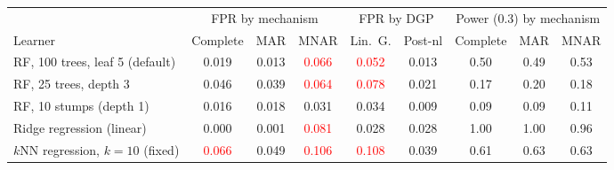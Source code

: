 \begin{tabular}{lcccccccc}
    \toprule
     & \multicolumn{3}{c}{FPR by mechanism} & \multicolumn{2}{c}{FPR by DGP} & \multicolumn{3}{c}{Power (0.3) by mechanism} \\
    \cmidrule(lr){2-4} \cmidrule(lr){5-6} \cmidrule(lr){7-9}
    Learner & Complete & MAR & MNAR & Lin.\ G. & Post-nl & Complete & MAR & MNAR \\
    \midrule
    RF, 100 trees, leaf 5 (default)      & 0.019 & 0.013 & \textcolor{red}{0.066} & \textcolor{red}{0.052} & 0.013 & 0.50 & 0.49 & 0.53 \\
    RF, 25 trees, depth 3                & 0.046 & 0.039 & \textcolor{red}{0.064} & \textcolor{red}{0.078} & 0.021 & 0.17 & 0.20 & 0.18 \\
    RF, 10 stumps (depth 1)              & 0.016 & 0.018 & 0.031 & 0.034 & 0.009 & 0.09 & 0.09 & 0.11 \\
    Ridge regression (linear)            & 0.000 & 0.001 & \textcolor{red}{0.081} & 0.028 & 0.028 & 1.00 & 1.00 & 0.96 \\
    $k$NN regression, $k{=}10$ (fixed)   & \textcolor{red}{0.066} & 0.049 & \textcolor{red}{0.106} & \textcolor{red}{0.108} & 0.039 & 0.61 & 0.63 & 0.63 \\
    \bottomrule
\end{tabular}

